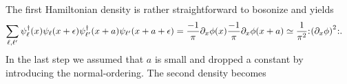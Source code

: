 \documentclass[english, parskip=full]{scrartcl}
\begin{document}
The first Hamiltonian density is rather straightforward to bosonize and yields
\begin{align}
\sum_{\ell,\ell'} \psi_{\ell}^\dagger(x) \psi_{\ell}(x+\epsilon) \psi_{\ell'}^\dagger(x+a) \psi_{\ell'}(x+a+\epsilon) &= \frac{-1}{\pi} \partial_x \phi(x) \frac{-1}{\pi} \partial_x\phi(x+a) \simeq \frac{1}{\pi^2} \normord{\kla*{\partial_x\phi}^2}.
\end{align}
In the last step we assumed that $a$ is small and dropped a constant by introducing the normal-ordering.
The second density becomes
\end{document}
